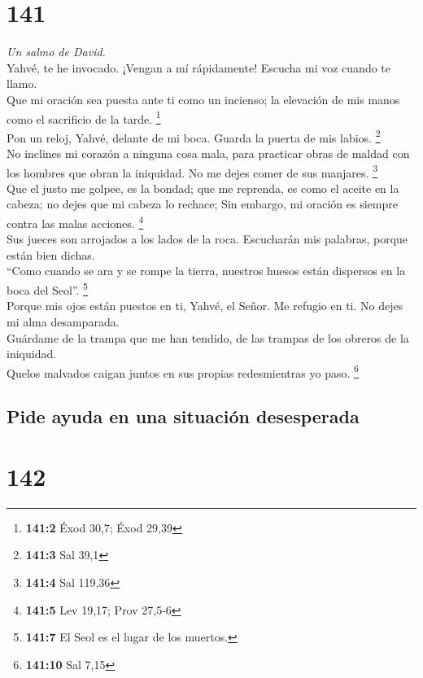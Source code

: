 \hypertarget{section-138}{%
\section{141}\label{section-138}}

\emph{Un salmo de David.}\\
 Yahvé, te he invocado. ¡Vengan a mí rápidamente! Escucha
mi voz cuando te llamo.\\
 Que mi oración sea puesta ante ti como un incienso; la
elevación de mis manos como el sacrificio de la tarde. \footnote{\textbf{141:2}
  Éxod 30,7; Éxod 29,39}\\
 Pon un reloj, Yahvé, delante de mi boca. Guarda la puerta
de mis labios. \footnote{\textbf{141:3} Sal 39,1}\\
 No inclines mi corazón a ninguna cosa mala, para
practicar obras de maldad con los hombres que obran la iniquidad. No me
dejes comer de sus manjares. \footnote{\textbf{141:4} Sal 119,36}\\
 Que el justo me golpee, es la bondad; que me reprenda, es
como el aceite en la cabeza; no dejes que mi cabeza lo rechace; Sin
embargo, mi oración es siempre contra las malas acciones. \footnote{\textbf{141:5}
  Lev 19,17; Prov 27,5-6}\\
 Sus jueces son arrojados a los lados de la roca.
Escucharán mis palabras, porque están bien dichas.\\
 ``Como cuando se ara y se rompe la tierra, nuestros
huesos están dispersos en la boca del Seol''. \footnote{\textbf{141:7}
  El Seol es el lugar de los muertos.}\\
 Porque mis ojos están puestos en ti, Yahvé, el Señor. Me
refugio en ti. No dejes mi alma desamparada.\\
 Guárdame de la trampa que me han tendido, de las trampas
de los obreros de la iniquidad.\\
 Quelos malvados caigan juntos en sus propias
redesmientras yo paso. \footnote{\textbf{141:10} Sal 7,15}

\hypertarget{pide-ayuda-en-una-situaciuxf3n-desesperada}{%
\subsection{Pide ayuda en una situación
desesperada}\label{pide-ayuda-en-una-situaciuxf3n-desesperada}}

\hypertarget{section-139}{%
\section{142}\label{section-139}}


